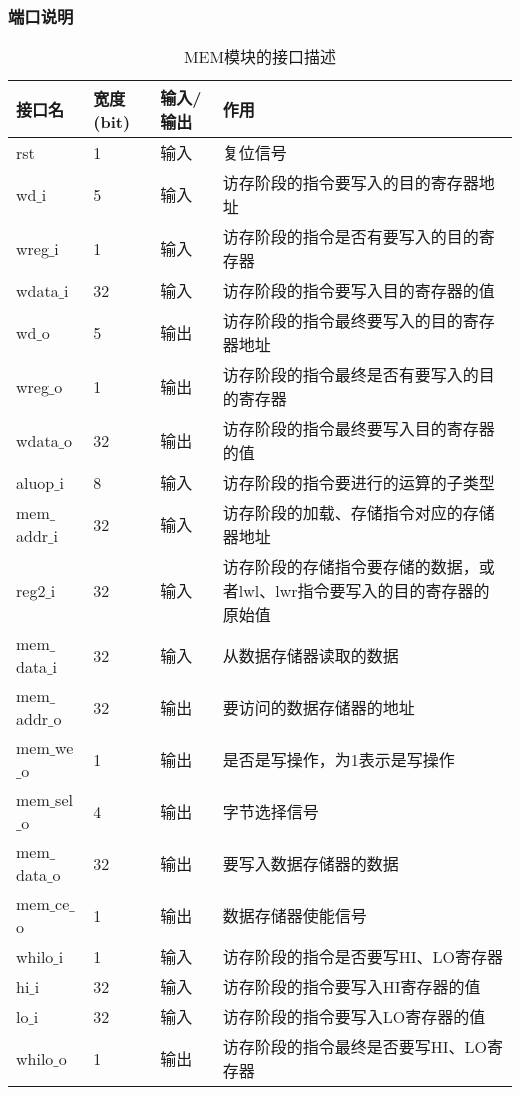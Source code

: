 \subsubsection{端口说明}
\begin{table}[H]
	\centering
	\caption{MEM模块的接口描述}
	\begin{tabular}{|l|l|l|l|}
		\hline
		接口名 & 宽度(bit) & 输入/输出 & 作用 \\
		\hline
		rst & 1 & 输入 & 复位信号 \\
		\hline
		wd$\_$i & 5 & 输入 & 访存阶段的指令要写入的目的寄存器地址 \\
		\hline
		wreg$\_$i & 1 & 输入 & 访存阶段的指令是否有要写入的目的寄存器 \\
		\hline
		wdata$\_$i & 32 & 输入 & 访存阶段的指令要写入目的寄存器的值 \\
		\hline
		wd$\_$o & 5 & 输出 & 访存阶段的指令最终要写入的目的寄存器地址 \\
		\hline
		wreg$\_$o & 1 & 输出 & 访存阶段的指令最终是否有要写入的目的寄存器 \\
		\hline
		wdata$\_$o & 32 & 输出 & 访存阶段的指令最终要写入目的寄存器的值 \\
		\hline
		aluop$\_$i & 8 & 输入 & 访存阶段的指令要进行的运算的子类型 \\
		\hline
		mem$\_$addr$\_$i & 32 & 输入 & 访存阶段的加载、存储指令对应的存储器地址 \\
		\hline
		reg2$\_$i & 32 & 输入 & 访存阶段的存储指令要存储的数据，或者lwl、lwr指令要写入的目的寄存器的原始值 \\
		\hline
		mem$\_$data$\_$i & 32 & 输入 & 从数据存储器读取的数据 \\
		\hline
		mem$\_$addr$\_$o & 32 & 输出 & 要访问的数据存储器的地址 \\
		\hline
		mem$\_$we$\_$o & 1 & 输出 & 是否是写操作，为1表示是写操作 \\
		\hline
		mem$\_$sel$\_$o & 4 & 输出 & 字节选择信号 \\
		\hline
		mem$\_$data$\_$o & 32 & 输出 & 要写入数据存储器的数据 \\
		\hline
		mem$\_$ce$\_$o & 1 & 输出 & 数据存储器使能信号 \\
		\hline
		whilo$\_$i & 1 & 输入 & 访存阶段的指令是否要写HI、LO寄存器 \\
		\hline
		hi$\_$i & 32 & 输入 & 访存阶段的指令要写入HI寄存器的值 \\
		\hline
		lo$\_$i & 32 & 输入 & 访存阶段的指令要写入LO寄存器的值 \\
		\hline
		whilo$\_$o & 1 & 输出 & 访存阶段的指令最终是否要写HI、LO寄存器 \\

\end{tabular}
\end{table}
